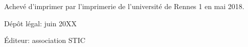\documentclass{sstic}
\begin{document}






\myclearpage
\cleardoublepage
\newpage
{} %
\renewcommand{\indexname}{Index des auteurs}
\printindex







\pagestyle{empty}

\clearpage

\begin{center}
\footnotesize
Achevé d'imprimer par l'imprimerie de l'université de Rennes 1 en mai 2018.

Dépôt légal: juin 20XX

Éditeur: association STIC
\end{center}

\ifssticpaper
\cleardoublepage
\fi
\end{document}
